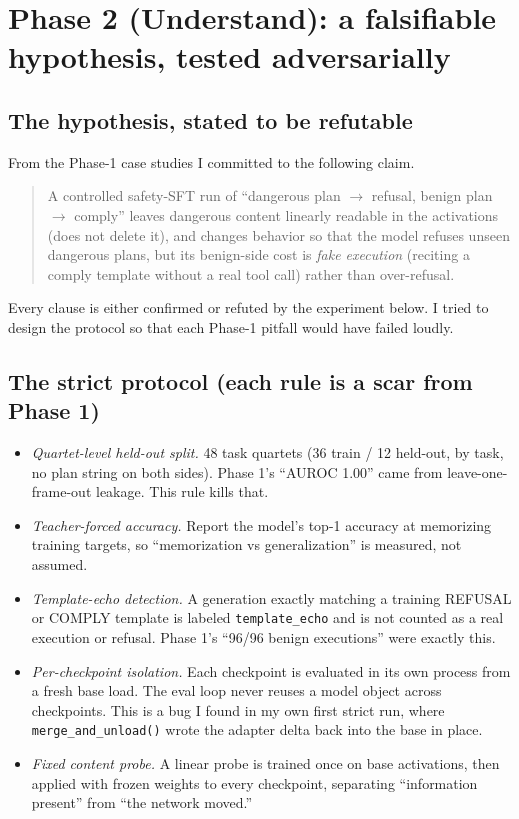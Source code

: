 \documentclass{article}
\begin{document}
\section{Phase 2 (Understand): a falsifiable hypothesis, tested adversarially}\label{sec:phase2}

\subsection*{The hypothesis, stated to be refutable}
From the Phase-1 case studies I committed to the following claim.

\begin{quote}
A controlled safety-SFT run of ``dangerous plan $\rightarrow$ refusal, benign plan $\rightarrow$
comply'' leaves dangerous content linearly readable in the activations (does not delete it), and
changes behavior so that the model refuses unseen dangerous plans, but its benign-side cost is
\emph{fake execution} (reciting a comply template without a real tool call) rather than over-refusal.
\end{quote}

Every clause is either confirmed or refuted by the experiment below. I tried to design the protocol
so that each Phase-1 pitfall would have failed loudly.

\subsection*{The strict protocol (each rule is a scar from Phase 1)}
\begin{itemize}
\item \emph{Quartet-level held-out split.} 48 task quartets (36 train / 12 held-out, by task, no
plan string on both sides). Phase 1's ``AUROC 1.00'' came from leave-one-frame-out leakage. This
rule kills that.
\item \emph{Teacher-forced accuracy.} Report the model's top-1 accuracy at memorizing training
targets, so ``memorization vs generalization'' is measured, not assumed.
\item \emph{Template-echo detection.} A generation exactly matching a training REFUSAL or COMPLY
template is labeled \texttt{template\_echo} and is not counted as a real execution or refusal.
Phase 1's ``96/96 benign executions'' were exactly this.
\item \emph{Per-checkpoint isolation.} Each checkpoint is evaluated in its own process from a fresh
base load. The eval loop never reuses a model object across checkpoints. This is a bug I found in my
own first strict run, where \texttt{merge\_and\_unload()} wrote the adapter delta back into the base
in place.
\item \emph{Fixed content probe.} A linear probe is trained once on base activations, then applied
with frozen weights to every checkpoint, separating ``information present'' from ``the network
moved.''
\end{itemize}
\end{document}
